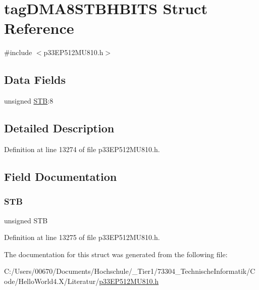 \hypertarget{structtag_d_m_a8_s_t_b_h_b_i_t_s}{}\section{tag\+D\+M\+A8\+S\+T\+B\+H\+B\+I\+TS Struct Reference}
\label{structtag_d_m_a8_s_t_b_h_b_i_t_s}


{\ttfamily \#include $<$p33\+E\+P512\+M\+U810.\+h$>$}

\subsection*{Data Fields}
\begin{DoxyCompactItemize}
\item 
unsigned \hyperlink{structtag_d_m_a8_s_t_b_h_b_i_t_s_a9bd043a4db27e09b5035a563a8758fe7}{S\+TB}\+:8
\end{DoxyCompactItemize}


\subsection{Detailed Description}


Definition at line 13274 of file p33\+E\+P512\+M\+U810.\+h.



\subsection{Field Documentation}
\mbox{\label{structtag_d_m_a8_s_t_b_h_b_i_t_s_a9bd043a4db27e09b5035a563a8758fe7}} 
\subsubsection{\texorpdfstring{S\+TB}{STB}}
{\footnotesize\ttfamily unsigned S\+TB}



Definition at line 13275 of file p33\+E\+P512\+M\+U810.\+h.



The documentation for this struct was generated from the following file\+:\begin{DoxyCompactItemize}
\item 
C\+:/\+Users/00670/\+Documents/\+Hochschule/\+\_\+\+Tier1/73304\+\_\+\+Technische\+Informatik/\+Code/\+Hello\+World4.\+X/\+Literatur/\hyperlink{p33_e_p512_m_u810_8h}{p33\+E\+P512\+M\+U810.\+h}\end{DoxyCompactItemize}
